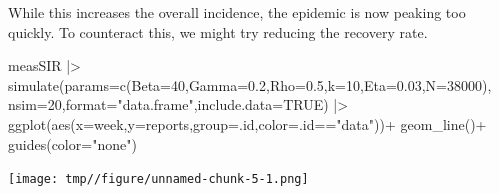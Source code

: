 \documentclass[
  ignorenonframetext,
  aspectratio=169,
  t]{beamer}
\newenvironment{Shaded}{\begin{snugshade}}{\end{snugshade}}
\newcommand{\AttributeTok}[1]{\textcolor[rgb]{0.40,0.45,0.13}{#1}}
\newcommand{\ConstantTok}[1]{\textcolor[rgb]{0.56,0.35,0.01}{#1}}
\newcommand{\DecValTok}[1]{\textcolor[rgb]{0.68,0.00,0.00}{#1}}
\newcommand{\FloatTok}[1]{\textcolor[rgb]{0.68,0.00,0.00}{#1}}
\newcommand{\FunctionTok}[1]{\textcolor[rgb]{0.28,0.35,0.67}{#1}}
\newcommand{\NormalTok}[1]{\textcolor[rgb]{0.00,0.23,0.31}{#1}}
\newcommand{\SpecialCharTok}[1]{\textcolor[rgb]{0.37,0.37,0.37}{#1}}
\newcommand{\StringTok}[1]{\textcolor[rgb]{0.13,0.47,0.30}{#1}}
\theoremstyle{definition}
\begin{document}
\begin{frame}[fragile]
While this increases the overall incidence, the epidemic is now peaking
too quickly. To counteract this, we might try reducing the recovery
rate.

\begin{Shaded}
\begin{Highlighting}[]
\NormalTok{measSIR }\SpecialCharTok{|\textgreater{}}
  \FunctionTok{simulate}\NormalTok{(}\AttributeTok{params=}\FunctionTok{c}\NormalTok{(}\AttributeTok{Beta=}\DecValTok{40}\NormalTok{,}\AttributeTok{Gamma=}\FloatTok{0.2}\NormalTok{,}\AttributeTok{Rho=}\FloatTok{0.5}\NormalTok{,}\AttributeTok{k=}\DecValTok{10}\NormalTok{,}\AttributeTok{Eta=}\FloatTok{0.03}\NormalTok{,}\AttributeTok{N=}\DecValTok{38000}\NormalTok{),}
    \AttributeTok{nsim=}\DecValTok{20}\NormalTok{,}\AttributeTok{format=}\StringTok{"data.frame"}\NormalTok{,}\AttributeTok{include.data=}\ConstantTok{TRUE}\NormalTok{) }\SpecialCharTok{|\textgreater{}}
  \FunctionTok{ggplot}\NormalTok{(}\FunctionTok{aes}\NormalTok{(}\AttributeTok{x=}\NormalTok{week,}\AttributeTok{y=}\NormalTok{reports,}\AttributeTok{group=}\NormalTok{.id,}\AttributeTok{color=}\NormalTok{.id}\SpecialCharTok{==}\StringTok{"data"}\NormalTok{))}\SpecialCharTok{+}
  \FunctionTok{geom\_line}\NormalTok{()}\SpecialCharTok{+}
  \FunctionTok{guides}\NormalTok{(}\AttributeTok{color=}\StringTok{"none"}\NormalTok{)}
\end{Highlighting}
\end{Shaded}

\begin{center}
\texttt{[image: tmp//figure/unnamed-chunk-5-1.png]}
\end{center}
\end{frame}
\end{document}
